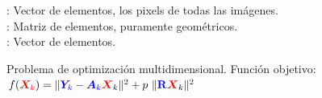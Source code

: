 \documentclass{beamer}
\begin{document}
{\begin{center}
 : Vector de  elementos, los pixels de todas las imágenes.\\
 : Matriz de  elementos, puramente geométricos.\\
 : Vector de  elementos.
\end{center}

\begin{center}
Problema de optimización multidimensional. Función objetivo:\\
$f(\textcolor{red}{\boldsymbol{X}_k}) = \| \textcolor{blue}{\boldsymbol{Y}_k} - \textcolor{blue}{\boldsymbol{A}_k} \textcolor{red}{\boldsymbol{X}}_k   \|^2 + 
 p\ \|  \textcolor{blue}{{\bf R}} \textcolor{red}{\boldsymbol{X}}_k   \|^2 \, $
\end{center}


}



\end{document}

